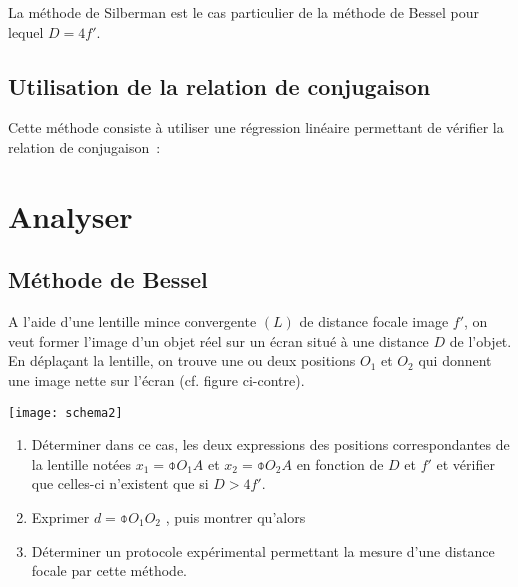 \documentclass[a4paper, 12pt, final, garamond]{book}
\begin{document}
La méthode de Silberman est le cas particulier de la méthode de Bessel pour
lequel $D=4f'$.

\subsection{Utilisation de la relation de conjugaison}

Cette méthode consiste à utiliser une régression linéaire permettant de vérifier
la relation de conjugaison~: 


\section{Analyser}

\subsection{Méthode de Bessel}

\begin{minipage}{0.49\linewidth}
    A l'aide d'une lentille mince convergente $(L)$ de distance focale image
    $f'$, on veut former l'image d'un objet réel sur un écran situé à une
    distance $D$ de l'objet. En déplaçant la lentille, on trouve une ou deux
    positions $O_1$ et $O_2$ qui donnent une image nette sur l'écran (cf. figure
    ci-contre).

\end{minipage}
\begin{minipage}{0.49\linewidth} 
  \begin{center}
    \texttt{[image: schema2]}
  \end{center}
\end{minipage} 

\begin{enumerate}
    \item Déterminer dans ce cas, les deux expressions des positions
        correspondantes de la lentille notées $x_1=\obar{O_1A}$ et
        $x_2=\obar{O_2A}$ en fonction de $D$ et $f'$ et vérifier que
        celles-ci n'existent que si $D>4f'$.
    \item Exprimer $d=\obar{O_1O_2}$ , puis montrer qu'alors
    \item Déterminer un protocole expérimental permettant la mesure d'une
        distance focale par cette méthode.
\end{enumerate}
\end{document}
